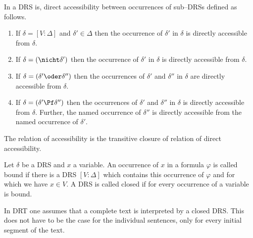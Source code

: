 \begin{defn}
In a DRS is, {\bmi direct accessibility} between occurrences 
of sub--DRSs defined as follows.
\begin{enumerate}
\item
If $\delta = [V : \Delta]$ and $\delta' \in \Delta$ then
the occurrence of $\delta'$ in $\delta$ is {\bmi directly
accessible from} $\delta$.
\item
If $\delta = (\nicht \delta')$ then the occurrence of
$\delta'$ in $\delta$ is {\bmi directly accessible from}
$\delta$.
\item
If $\delta = (\delta' \oder \delta'')$ then the occurrences
of $\delta'$ and $\delta''$ in $\delta$ are {\bmi directly
accessible from} $\delta$.
\item
If $\delta = (\delta' \Pf \delta'')$ then the occurrences
of $\delta'$ and $\delta''$ in $\delta$ is {\bmi directly
accessible from} $\delta$. Further, the named occurrence of
$\delta''$ is {\bmi directly accessible from} the named occurrence
of $\delta'$.
\end{enumerate}
The relation of {\bmi accessibility} is the transitive
closure of relation of direct accessibility.
\end{defn}
\begin{defn}
Let $\delta$ be a DRS and $x$ a variable. An occurrence of
$x$ in a formula $\varphi$ is called {\bmi bound} if there is
a DRS $[V : \Delta]$ which contains this occurrence
of $\varphi$ and for which we have $x \in V$. A DRS is called
{\bmi closed} if for every occurrence of a variable is bound.
\end{defn}
In DRT one assumes that a complete text is interpreted by a closed
DRS. This does not have to be the case for the individual
sentences, only for every initial segment of the text.


